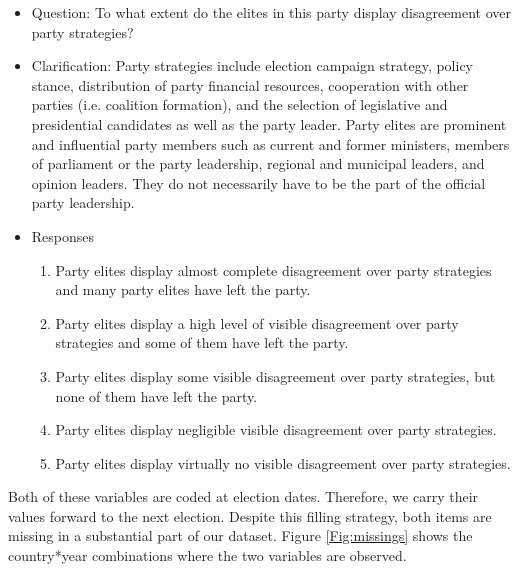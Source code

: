 \documentclass[12pt]{article}
\begin{document}
\begin{itemize}
  \item[]{Question: To what extent do the elites in this party display disagreement over party strategies?}
  \item[]{Clarification: Party strategies include election campaign strategy, policy stance, distribution of party financial resources, cooperation with other parties (i.e. coalition formation), and the selection of legislative and presidential candidates as well as the party leader. Party elites are prominent and influential party members such as current and former ministers, members of parliament or the party leadership, regional and municipal leaders, and opinion leaders. They do not necessarily have to be the part of the official party leadership.}
  \item[]{Responses}
  \begin{enumerate}
  \item{Party elites display almost complete disagreement over party strategies and many party elites have left the party.}
  \item{Party elites display a high level of visible disagreement over party strategies and some of them have left the party.}
  \item{Party elites display some visible disagreement over party strategies, but none of them have left the party.}
  \item{Party elites display negligible visible disagreement over party strategies.}
  \item{Party elites display virtually no visible disagreement over party strategies.}
  \end{enumerate}
\end{itemize}

Both of these variables are coded at election dates. Therefore, we carry their values forward to the next election. Despite this filling strategy, both items are missing in a substantial part of our dataset. Figure \ref{Fig:missings} shows the country*year combinations where the two variables are observed.
\end{document}
